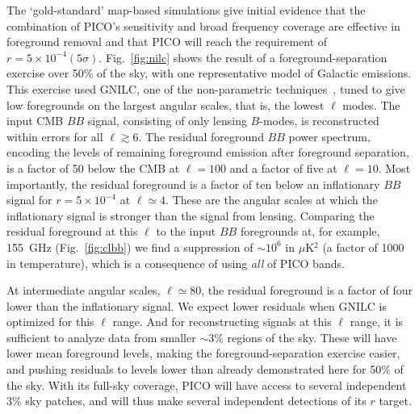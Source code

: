 \documentclass[PICOReport.tex]{subfiles}
\begin{document}
The `gold-standard' map-based simulations give initial evidence that the combination of PICO's sensitivity and broad frequency coverage are effective in foreground removal and that PICO will reach the requirement of $r = 5\times 10^{-4} (5\sigma)$. Fig.~\ref{fig:nilc} shows the result of a foreground-separation exercise over 50\% of the sky, with one representative model of Galactic emissions.  This exercise used GNILC, one of the non-parametric techniques~\citep{gnilc}, tuned to give low foregrounds on the largest angular scales, that is, the lowest $\ell$ modes. The input CMB $BB$ signal, consisting of only lensing $B$-modes, is reconstructed within errors for all $\ell \gtrsim 6$.  The residual foreground $BB$ power spectrum, encoding the levels of remaining foreground emission after foreground separation, is a factor of 50 below the CMB at $\ell=100$ and a factor of five at $\ell=10$. Most importantly, the residual foreground is a factor of ten below an inflationary $BB$ signal for  $r = 5\times 10^{-4}$ at $\ell \simeq 4$.  These are the angular scales at which the inflationary signal is stronger than the signal from lensing. Comparing the residual foreground at this $\ell$ to the input $BB$ foregrounds at, for example, 155~GHz (Fig.~\ref{fig:clbb}) we find a suppression of $\sim10^{6}$ in $\mu$K$^{2}$ (a factor of 1000 in temperature), which is a consequence of using {\it all} of PICO bands.

At intermediate angular scales, $\ell \simeq 80$, the residual foreground is a factor of four lower than the inflationary signal. We expect lower residuals when GNILC is optimized for this $\ell$ range. And for reconstructing signals at this $\ell$ range, it is sufficient to analyze data from smaller $\sim$3\% regions of the sky. These will have lower mean foreground levels, making the foreground-separation exercise easier, and pushing residuals to levels lower than already demonstrated here for 50\% of the sky. With its full-sky coverage, PICO will have access to several independent 3\% sky patches, and will thus make several independent detections of its $r$ target. 


\end{document}
